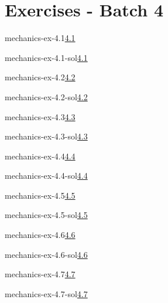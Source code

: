 \documentclass[preview]{standalone}
\begin{document}
\genpage

\section{Exercises - Batch 4}

\begin{snippetexercise}{mechanics-ex-4.1}{\underline{4.1}}
    \todo
\end{snippetexercise}

\begin{snippetsolution}{mechanics-ex-4.1-sol}{\underline{4.1}}
    \todo
\end{snippetsolution}

\begin{snippetexercise}{mechanics-ex-4.2}{\underline{4.2}}
    \todo
\end{snippetexercise}

\begin{snippetsolution}{mechanics-ex-4.2-sol}{\underline{4.2}}
    \todo
\end{snippetsolution}

\begin{snippetexercise}{mechanics-ex-4.3}{\underline{4.3}}
    \todo
\end{snippetexercise}

\begin{snippetsolution}{mechanics-ex-4.3-sol}{\underline{4.3}}
    \todo
\end{snippetsolution}

\begin{snippetexercise}{mechanics-ex-4.4}{\underline{4.4}}
    \todo
\end{snippetexercise}

\begin{snippetsolution}{mechanics-ex-4.4-sol}{\underline{4.4}}
    \todo
\end{snippetsolution}

\begin{snippetexercise}{mechanics-ex-4.5}{\underline{4.5}}
    \todo
\end{snippetexercise}

\begin{snippetsolution}{mechanics-ex-4.5-sol}{\underline{4.5}}
    \todo
\end{snippetsolution}

\begin{snippetexercise}{mechanics-ex-4.6}{\underline{4.6}}
    \todo
\end{snippetexercise}

\begin{snippetsolution}{mechanics-ex-4.6-sol}{\underline{4.6}}
    \todo
\end{snippetsolution}

\begin{snippetexercise}{mechanics-ex-4.7}{\underline{4.7}}
    \todo
\end{snippetexercise}

\begin{snippetsolution}{mechanics-ex-4.7-sol}{\underline{4.7}}
    \todo
\end{snippetsolution}
\end{document}

